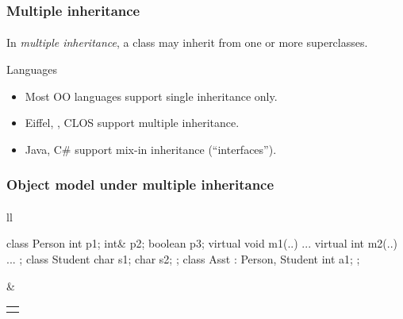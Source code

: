 \documentclass{beamer}
\begin{document}
\begin{frame}[fragile]
\frametitle{Multiple inheritance}
\framesubtitle{}
In \textit{multiple inheritance}, a class may inherit from one or
more superclasses.
\bigskip

Languages
\begin{itemize}
\item Most OO languages support single inheritance only.
\item Eiffel, \cpp, CLOS support multiple inheritance.
\item Java, C\# support mix-in inheritance (``interfaces''). 

\end{itemize}
\end{frame}

\begin{frame}[fragile]
\frametitle{Object model under multiple inheritance}
\framesubtitle{}
\begin{tabular}{ll}
\begin{minipage}{4.3cm}
\begin{cplus3}
class Person
{ 
   int p1;
   int& p2;
   boolean p3; 
   virtual void m1(..) {...}
   virtual int m2(..) {...}  
};
class Student 
{
   char s1;
   char s2;
};
class Asst : Person, Student 
{
    int a1;
};
\end{cplus3}
\end{minipage}

& 

\begin{tabular}{l}
{\small 
\begin{tikzpicture}

\draw (0,-2.5)  rectangle (1.2,-3.0);
\pgftext[at={\pgfpoint{0.5cm}{-2.75cm}}]{a1} ;

\draw (0,-2.5)  rectangle (1.2,-2.0);
\pgftext[at={\pgfpoint{0.5cm}{-2.25cm}}]{} ;
\draw[->, thick] (1.0, -2.25) -- (3.0,-2.25); 
\pgftext[at={\pgfpoint{3.8cm}{-2.25cm}}]{\textit{vtbl Asst}} ;

\draw (0,-2.0)  rectangle (1.2,-1.0);
\pgftext[at={\pgfpoint{0.5cm}{-1.25cm}}]{s1} ;
\pgftext[at={\pgfpoint{0.5cm}{-1.75cm}}]{s2} ;

\draw (0,-1.0)  rectangle (1.2,-0.5);
\pgftext[at={\pgfpoint{-0.25cm}{-0.75cm}}]{} ;
\draw[->, thick] (1.0, -0.75) -- (3.0,-0.75); 
\pgftext[at={\pgfpoint{4.0cm}{-0.75cm}}]{\textit{vtbl Student}} ;

\pgftext[at={\pgfpoint{0.5cm}{-0.25cm}}]{p1} ;
\pgftext[at={\pgfpoint{0.5cm}{0.25cm}}]{p2} ;
\pgftext[at={\pgfpoint{0.5cm}{0.75cm}}]{p3} ;
\draw (0,-0.5)  rectangle (1.2,1.5);


\end{tikzpicture}}
\end{tabular}
\end{tabular}
\end{frame}
\end{document}
